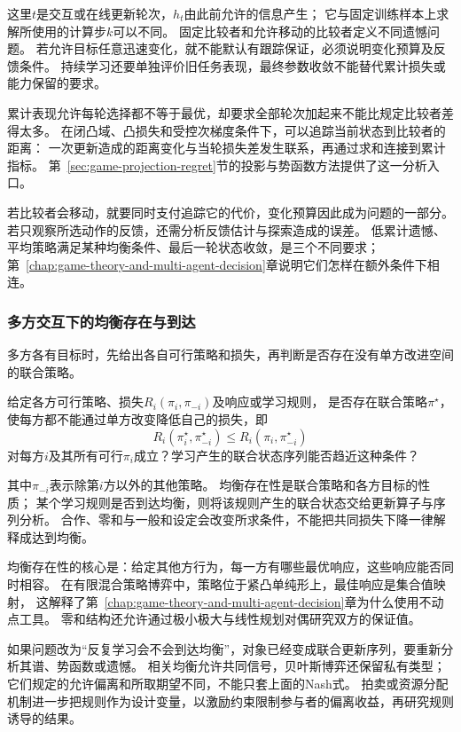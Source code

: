 这里$t$是交互或在线更新轮次，$h_t$由此前允许的信息产生；
它与固定训练样本上求解所使用的计算步$k$可以不同。
固定比较者和允许移动的比较者定义不同遗憾问题。
若允许目标任意迅速变化，就不能默认有跟踪保证，必须说明变化预算及反馈条件。
持续学习还要单独评价旧任务表现，最终参数收敛不能替代累计损失或能力保留的要求。

累计表现允许每轮选择都不等于最优，却要求全部轮次加起来不能比规定比较者差得太多。
在闭凸域、凸损失和受控次梯度条件下，可以追踪当前状态到比较者的距离：
一次更新造成的距离变化与当轮损失差发生联系，再通过求和连接到累计指标。
第~\ref{sec:game-projection-regret}节的投影与势函数方法提供了这一分析入口。

若比较者会移动，就要同时支付追踪它的代价，变化预算因此成为问题的一部分。
若只观察所选动作的反馈，还需分析反馈估计与探索造成的误差。
低累计遗憾、平均策略满足某种均衡条件、最后一轮状态收敛，是三个不同要求；
第~\ref{chap:game-theory-and-multi-agent-decision}章说明它们怎样在额外条件下相连。

\subsubsection{多方交互下的均衡存在与到达}
\label{sec:future-analysis-equilibrium}

多方各有目标时，先给出各自可行策略和损失，再判断是否存在没有单方改进空间的联合策略。

\begin{mathproblem}[多方响应能否达到所求均衡]
  \label{question:future-equilibrium}
  给定各方可行策略、损失$R_i(\pi_i,\pi_{-i})$及响应或学习规则，
  是否存在联合策略$\pi^\star$，使每方都不能通过单方改变降低自己的损失，即
  \[
    R_i(\pi_i^\star,\pi_{-i}^\star)
    \leq R_i(\pi_i,\pi_{-i}^\star)
  \]
  对每方$i$及其所有可行$\pi_i$成立？学习产生的联合状态序列能否趋近这种条件？
\end{mathproblem}

其中$\pi_{-i}$表示除第$i$方以外的其他策略。
均衡存在性是联合策略和各方目标的性质；
某个学习规则是否到达均衡，则将该规则产生的联合状态交给更新算子与序列分析。
合作、零和与一般和设定会改变所求条件，不能把共同损失下降一律解释成达到均衡。

均衡存在性的核心是：给定其他方行为，每一方有哪些最优响应，这些响应能否同时相容。
在有限混合策略博弈中，策略位于紧凸单纯形上，最佳响应是集合值映射，
这解释了第~\ref{chap:game-theory-and-multi-agent-decision}章为什么使用不动点工具。
零和结构还允许通过极小极大与线性规划对偶研究双方的保证值。

如果问题改为“反复学习会不会到达均衡”，对象已经变成联合更新序列，要重新分析其谱、势函数或遗憾。
相关均衡允许共同信号，贝叶斯博弈还保留私有类型；它们规定的允许偏离和所取期望不同，不能只套上面的Nash式。
拍卖或资源分配机制进一步把规则作为设计变量，以激励约束限制参与者的偏离收益，再研究规则诱导的结果。

